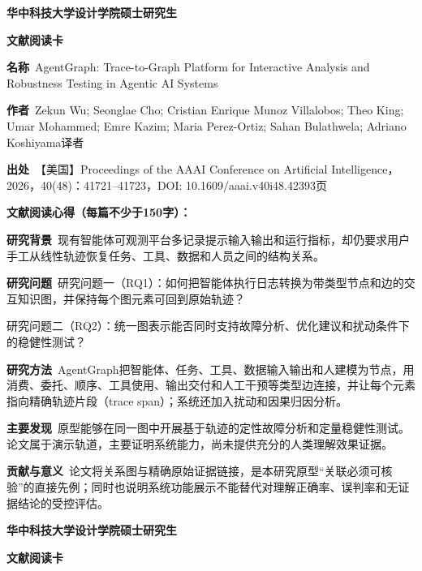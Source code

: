 \clearpage
\begin{center}
{\songti\bfseries\fontsize{18.5pt}{27.75pt}\selectfont 华中科技大学设计学院硕士研究生\par}
{\songti\bfseries\fontsize{18.5pt}{27.75pt}\selectfont 文献阅读卡\par}
\end{center}
\vspace{0.25em}
\noindent\underline{}\par
\vspace{0.35em}
\noindent\textbf{名称}\ AgentGraph: Trace-to-Graph Platform for Interactive Analysis and Robustness Testing in Agentic AI Systems\par
\noindent\textbf{作者}\ Zekun Wu; Seonglae Cho; Cristian Enrique Munoz Villalobos; Theo King; Umar Mohammed; Emre Kazim; Maria Perez-Ortiz; Sahan Bulathwela; Adriano Koshiyama\quad 译者\par
\noindent\textbf{出处}\ 【美国】Proceedings of the AAAI Conference on Artificial Intelligence，2026，40(48)：41721–41723，DOI: 10.1609/aaai.v40i48.42393\quad 页\par
\vspace{0.35em}
\noindent\textbf{文献阅读心得（每篇不少于150字）：}\par
\noindent\textbf{研究背景}\ 现有智能体可观测平台多记录提示输入输出和运行指标，却仍要求用户手工从线性轨迹恢复任务、工具、数据和人员之间的结构关系。\par
\noindent\textbf{研究问题}\ 研究问题一（RQ1）：如何把智能体执行日志转换为带类型节点和边的交互知识图，并保持每个图元素可回到原始轨迹？\par
研究问题二（RQ2）：统一图表示能否同时支持故障分析、优化建议和扰动条件下的稳健性测试？\par
\noindent\textbf{研究方法}\ AgentGraph把智能体、任务、工具、数据输入输出和人建模为节点，用消费、委托、顺序、工具使用、输出交付和人工干预等类型边连接，并让每个元素指向精确轨迹片段（trace span）；系统还加入扰动和因果归因分析。\par
\noindent\textbf{主要发现}\ 原型能够在同一图中开展基于轨迹的定性故障分析和定量稳健性测试。论文属于演示轨道，主要证明系统能力，尚未提供充分的人类理解效果证据。\par
\noindent\textbf{贡献与意义}\ 论文将关系图与精确原始证据链接，是本研究原型“关联必须可核验”的直接先例；同时也说明系统功能展示不能替代对理解正确率、误判率和无证据结论的受控评估。\par
\clearpage
\begin{center}
{\songti\bfseries\fontsize{18.5pt}{27.75pt}\selectfont 华中科技大学设计学院硕士研究生\par}
{\songti\bfseries\fontsize{18.5pt}{27.75pt}\selectfont 文献阅读卡\par}
\end{center}
